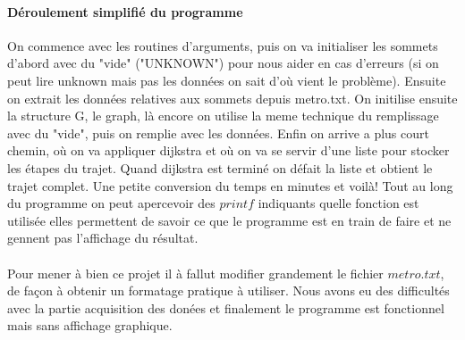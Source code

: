 \documentclass[a4paper]{article}
\begin{document}
  \paragraph{Déroulement simplifié du programme}
  On commence avec les routines d'arguments, puis on va initialiser les sommets d'abord avec du "vide" ("UNKNOWN") pour nous aider en cas d'erreurs (si on peut lire unknown mais pas les données on sait d'où vient le problème). Ensuite on extrait les données relatives aux sommets depuis metro.txt.
  On initilise ensuite la structure G, le graph, là encore on utilise la meme technique du remplissage avec du "vide", puis on remplie avec les données.
  Enfin on arrive a plus court chemin, où on va appliquer dijkstra et où on va se servir d'une liste pour stocker les étapes du trajet.
  Quand dijkstra est terminé on défait la liste et obtient le trajet complet. Une petite conversion du temps en minutes et voilà!
  Tout au long du programme on peut apercevoir des $printf$ indiquants quelle fonction est utilisée elles permettent de savoir ce que le programme est en train de faire et ne gennent pas l'affichage du résultat.
  \paragraph{}
  Pour mener à bien ce projet il à fallut modifier grandement le fichier $metro.txt$, de façon à obtenir un formatage pratique à utiliser.
  Nous avons eu des difficultés avec la partie acquisition des donées et finalement le programme est fonctionnel mais sans affichage graphique.
\end{document}
